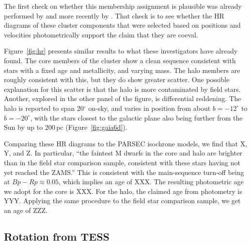 \documentclass[12pt,twocolumn,tighten]{aastex63}
\begin{document}
The first check on whether this membership assignment is plausible was
already performed by \citet{kounkel_untangling_2019} and more recently
by \citet{meingast_2021}.  That check is to see whether the HR
diagrams of these cluster components that were selected based on
positions and velocities photometrically support the claim that they
are coeval.

Figure~\ref{fig:hr} presents similar results to what these
investigators have already found.  The core members of the cluster
show a clean sequence consistent with stars with a fixed age and
metallicity, and varying mass.
The halo members are roughly consistent with this, but they do show
greater scatter.  One possible explanation for this scatter is that
the halo is more contaminated by field stars.
Another, explored in the other panel of the figure, is differential
reddening.
The halo is reported to span 20$^\circ$ on-sky, and varies in position from
about $b=-12^\circ$ to $b=-20^\circ$, with the stars closest to the
galactic plane also being further from the Sun
by up to 200\,pc (Figure~\ref{fig:gaia6d}).

Comparing these HR diagrams to the PARSEC isochrone models, we find
that X, Y, and Z.
In particular, ``the faintest M dwarfs in the core and halo are
brighter than in the field star comparison sample, consistent with
these stars having not yet reached the ZAMS.''
This is consistent with the 
main-sequence turn-off being at $Bp-Rp\approx0.05$, which implies an
age of XXX.
The resulting photometric age we adopt for the core is XXX.
For the halo, the claimed age from photometry is YYY.
Applying the same procedure to the field star comparison sample,
we get an age of ZZZ.


\subsection{Rotation from TESS}
\label{subsec:tess}
\end{document}

